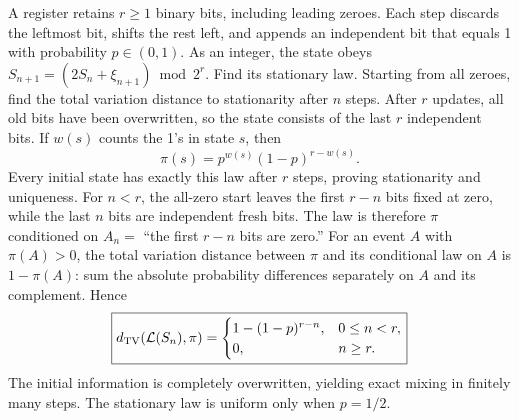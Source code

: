 A register retains $r\ge1$ binary bits, including leading zeroes. Each step discards the leftmost bit, shifts the rest left, and appends an independent bit that equals 1 with probability $p\in(0,1)$. As an integer, the state obeys $S_{n+1}=(2S_n+\xi_{n+1})\bmod 2^r$. Find its stationary law. Starting from all zeroes, find the total variation distance to stationarity after $n$ steps.
\solution After $r$ updates, all old bits have been overwritten, so the state consists of the last $r$ independent bits. If $w(s)$ counts the 1's in state $s$, then
\[
 \boxed{\pi(s)=p^{w(s)}(1-p)^{r-w(s)}}.
\]
Every initial state has exactly this law after $r$ steps, proving stationarity and uniqueness. For $n<r$, the all-zero start leaves the first $r-n$ bits fixed at zero, while the last $n$ bits are independent fresh bits. The law is therefore $\pi$ conditioned on $A_n=$ ``the first $r-n$ bits are zero.'' For an event $A$ with $\pi(A)>0$, the total variation distance between $\pi$ and its conditional law on $A$ is $1-\pi(A)$: sum the absolute probability differences separately on $A$ and its complement. Hence
\[
 \boxed{d_{\rm TV}(\mathcal L(S_n),\pi)=
 \begin{cases}1-(1-p)^{r-n},&0\le n<r,\\0,&n\ge r.\end{cases}}
\]
\insight The initial information is completely overwritten, yielding exact mixing in finitely many steps. The stationary law is uniform only when $p=1/2$.
